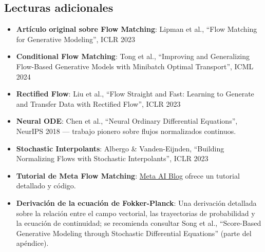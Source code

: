 \subsection{Lecturas adicionales}

\begin{itemize}
    \item \textbf{Artículo original sobre Flow Matching}: Lipman et al., ``Flow Matching for Generative Modeling'', ICLR 2023
    \item \textbf{Conditional Flow Matching}: Tong et al., ``Improving and Generalizing Flow-Based Generative Models with Minibatch Optimal Transport'', ICML 2024
    \item \textbf{Rectified Flow}: Liu et al., ``Flow Straight and Fast: Learning to Generate and Transfer Data with Rectified Flow'', ICLR 2023
    \item \textbf{Neural ODE}: Chen et al., ``Neural Ordinary Differential Equations'', NeurIPS 2018 — trabajo pionero sobre flujos normalizados continuos.
    \item \textbf{Stochastic Interpolants}: Albergo \& Vanden-Eijnden, ``Building Normalizing Flows with Stochastic Interpolants'', ICLR 2023
    \item \textbf{Tutorial de Meta Flow Matching}: \href{https://ai.meta.com/blog/flow-matching-guide-generative-ai/}{Meta AI Blog} ofrece un tutorial detallado y código.
    \item \textbf{Derivación de la ecuación de Fokker-Planck}: Una derivación detallada sobre la relación entre el campo vectorial, las trayectorias de probabilidad y la ecuación de continuidad; se recomienda consultar Song et al., ``Score-Based Generative Modeling through Stochastic Differential Equations'' (parte del apéndice).
\end{itemize}



